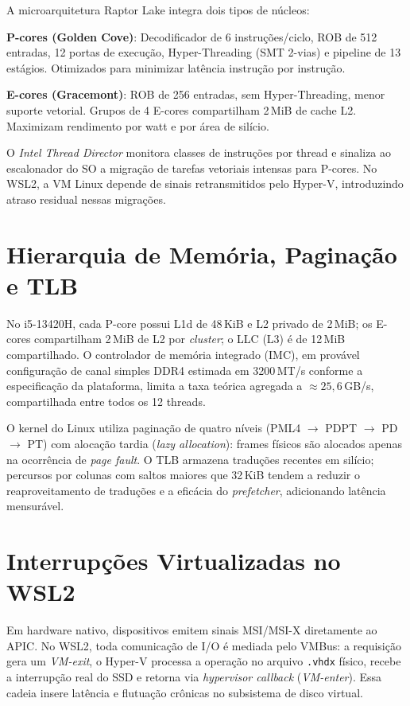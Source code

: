 \documentclass[
	12pt,
	openright,
	oneside,
	a4paper,
	english,
	brazil
	]{abntex2}
\begin{document}
A microarquitetura Raptor Lake \cite{intel2021hybrid,intel2022raptorlake} integra dois tipos de núcleos:

\textbf{P-cores (Golden Cove)}: Decodificador de 6 instruções/ciclo, ROB de 512 entradas, 12 portas de execução, Hyper-Threading (SMT 2-vias) e pipeline de 13 estágios. Otimizados para minimizar latência instrução por instrução.

\textbf{E-cores (Gracemont)}: ROB de 256 entradas, sem Hyper-Threading, menor suporte vetorial. Grupos de 4 E-cores compartilham 2\,MiB de cache L2. Maximizam rendimento por watt e por área de silício.

O \textit{Intel Thread Director} \cite{intel2022threaddir} monitora classes de instruções por thread e sinaliza ao escalonador do SO a migração de tarefas vetoriais intensas para P-cores. No WSL2, a VM Linux depende de sinais retransmitidos pelo Hyper-V, introduzindo atraso residual nessas migrações.

\section{Hierarquia de Memória, Paginação e TLB}
\label{sec:memoria_tlb}

No i5-13420H, cada P-core possui L1d de 48\,KiB e L2 privado de 2\,MiB; os E-cores compartilham 2\,MiB de L2 por \textit{cluster}; o LLC (L3) é de 12\,MiB compartilhado. O controlador de memória integrado (IMC), em provável configuração de canal simples DDR4 estimada em 3200\,MT/s conforme a especificação da plataforma, limita a taxa teórica agregada a $\approx 25{,}6$\,GB/s, compartilhada entre todos os 12 threads.

O kernel do Linux utiliza paginação de quatro níveis (PML4 $\to$ PDPT $\to$ PD $\to$ PT) com alocação tardia (\textit{lazy allocation}): frames físicos são alocados apenas na ocorrência de \textit{page fault}. O TLB armazena traduções recentes em silício; percursos por colunas com saltos maiores que 32\,KiB tendem a reduzir o reaproveitamento de traduções e a eficácia do \textit{prefetcher}, adicionando latência mensurável.

\section{Interrupções Virtualizadas no WSL2}
\label{sec:interrupcoes}

Em hardware nativo, dispositivos emitem sinais MSI/MSI-X diretamente ao APIC. No WSL2, toda comunicação de I/O é mediada pelo VMBus: a requisição gera um \textit{VM-exit}, o Hyper-V processa a operação no arquivo \texttt{.vhdx} físico, recebe a interrupção real do SSD e retorna via \textit{hypervisor callback} (\textit{VM-enter}). Essa cadeia insere latência e flutuação crônicas no subsistema de disco virtual.
\end{document}
